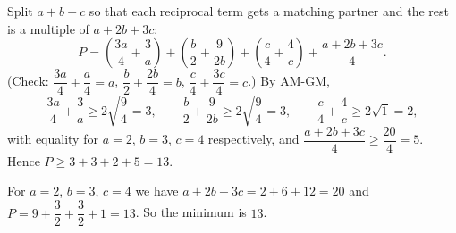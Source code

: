 Split $a+b+c$ so that each reciprocal term gets a matching partner and the rest is a multiple of $a+2b+3c$:
\[
P=\left(\dfrac{3a}{4}+\dfrac{3}{a}\right)+\left(\dfrac {b}{2}+\dfrac{9}{2b}\right)+\left(\dfrac {c}{4}+\dfrac{4}{c}\right)+\dfrac{a+2b+3c}{4}.
\]
(Check: $\dfrac{3a}{4}+\dfrac {a}{4}=a$, $\dfrac {b}{2}+\dfrac{2b}{4}=b$, $\dfrac {c}{4}+\dfrac{3c}{4}=c$.) By AM-GM,
\[
\dfrac{3a}{4}+\dfrac{3}{a}\ge2\sqrt{\dfrac{9}{4}}=3,\qquad \dfrac {b}{2}+\dfrac{9}{2b}\ge2\sqrt{\dfrac{9}{4}}=3,\qquad \dfrac {c}{4}+\dfrac{4}{c}\ge2\sqrt1=2,
\]
with equality for $a=2$, $b=3$, $c=4$ respectively, and $\dfrac{a+2b+3c}{4}\ge\dfrac{20}{4}=5$. Hence $P\ge3+3+2+5=13$.

For $a=2$, $b=3$, $c=4$ we have $a+2b+3c=2+6+12=20$ and $P=9+\dfrac{3}{2}+\dfrac{3}{2}+1=13$. So the minimum is $\boxed{13}$.
